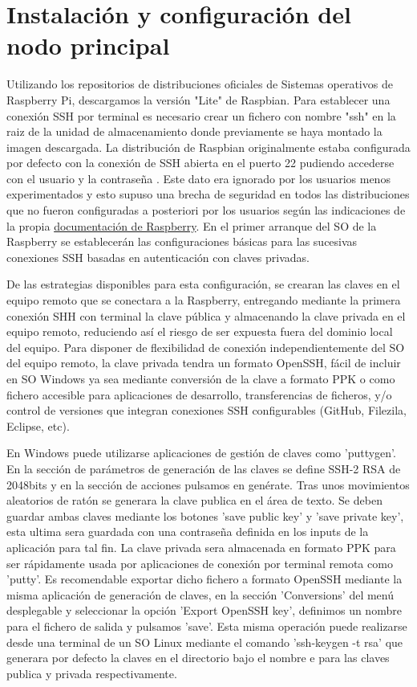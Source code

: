 \section{Instalación y configuración del nodo principal}
\label{makereference1.6}
 Utilizando los repositorios de distribuciones oficiales de Sistemas operativos de Raspberry Pi, descargamos la versión "Lite" de Raspbian. Para establecer una conexión SSH por terminal es necesario crear un fichero con nombre "ssh" en la raiz de la unidad de almacenamiento donde previamente se haya montado la imagen descargada. La distribución de Raspbian originalmente estaba configurada por defecto con la conexión de SSH abierta en el puerto 22 pudiendo accederse con el usuario  y la contraseña . Este dato era ignorado por los usuarios menos experimentados y esto supuso una brecha de seguridad en todos las distribuciones que no fueron configuradas a posteriori por los usuarios según las indicaciones de la propia  \href{https://www.raspberrypi.org/documentation/configuration/security.md}{documentación de Raspberry}. En el primer arranque del SO de la Raspberry se establecerán las configuraciones básicas para las sucesivas conexiones SSH basadas en autenticación con claves privadas.

 De las estrategias disponibles para esta configuración, se crearan las claves en el equipo remoto que se conectara a la Raspberry, entregando mediante la primera conexión SHH con terminal la clave pública y almacenando la clave privada en el equipo remoto, reduciendo así el riesgo de ser expuesta fuera del dominio local del equipo. Para disponer de flexibilidad de conexión independientemente del SO del equipo remoto, la clave privada tendra un formato OpenSSH, fácil de incluir en SO Windows ya sea mediante conversión de la clave a formato PPK o como fichero accesible para aplicaciones de desarrollo, transferencias de ficheros, y/o control de versiones que integran conexiones SSH configurables (GitHub, Filezila, Eclipse, etc).

En Windows puede utilizarse aplicaciones de gestión de claves como 'puttygen'. En la sección de parámetros de generación de las claves se define SSH-2 RSA de 2048bits y en la sección de acciones pulsamos en genérate. Tras unos movimientos aleatorios de ratón se generara la clave publica en el área de texto. Se deben guardar ambas claves mediante los botones 'save public key' y 'save private key', esta ultima sera guardada con una contraseña definida en los inputs de la aplicación para tal fin. La clave privada sera almacenada en formato PPK para ser rápidamente usada por aplicaciones de conexión por terminal remota como 'putty'. Es recomendable exportar dicho fichero a formato OpenSSH mediante la misma aplicación de generación de claves, en la sección 'Conversions' del menú desplegable y seleccionar la opción 'Export OpenSSH key', definimos  un nombre para el fichero de salida y pulsamos 'save'. Esta misma operación puede realizarse desde una terminal de un SO Linux mediante el comando 'ssh-keygen -t rsa' que generara por defecto la claves en el directorio  bajo el nombre  e  para las claves publica y privada respectivamente.

